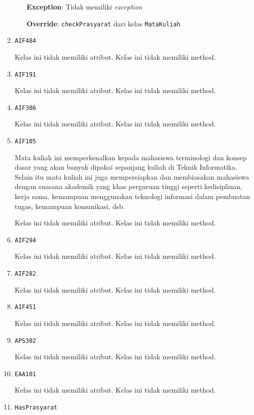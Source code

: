 \documentclass{article}
\begin{document}
\begin{enumerate}
\begin{itemize}
\textbf{Exception}: Tidak memiliki \textit{exception}

\textbf{Override}: \texttt{checkPrasyarat} dari kelas \texttt{MataKuliah}

\end{itemize}
\item \texttt{AIF484}



Kelas ini tidak memiliki atribut. Kelas ini tidak memiliki method. \item \texttt{AIF191}



Kelas ini tidak memiliki atribut. Kelas ini tidak memiliki method. \item \texttt{AIF386}



Kelas ini tidak memiliki atribut. Kelas ini tidak memiliki method. \item \texttt{AIF105}

Mata kuliah ini memperkenalkan kepada mahasiswa terminologi dan konsep dasar 
 yang akan banyak dipakai sepanjang kuliah di Teknik Informatika. Selain itu 
 mata kuliah ini juga mempersiapkan dan membiasakan mahasiswa dengan suasana 
 akademik yang khas perguruan tinggi seperti kedisiplinan, kerja sama, 
 kemampuan menggunakan teknologi informasi dalam pembuatan tugas, kemampuan 
 komunikasi, dsb.

Kelas ini tidak memiliki atribut. Kelas ini tidak memiliki method. \item \texttt{AIF294}



Kelas ini tidak memiliki atribut. Kelas ini tidak memiliki method. \item \texttt{AIF282}



Kelas ini tidak memiliki atribut. Kelas ini tidak memiliki method. \item \texttt{AIF451}



Kelas ini tidak memiliki atribut. Kelas ini tidak memiliki method. \item \texttt{APS302}



Kelas ini tidak memiliki atribut. Kelas ini tidak memiliki method. \item \texttt{EAA101}



Kelas ini tidak memiliki atribut. Kelas ini tidak memiliki method. \item \texttt{HasPrasyarat}


\end{enumerate}
\end{document}
